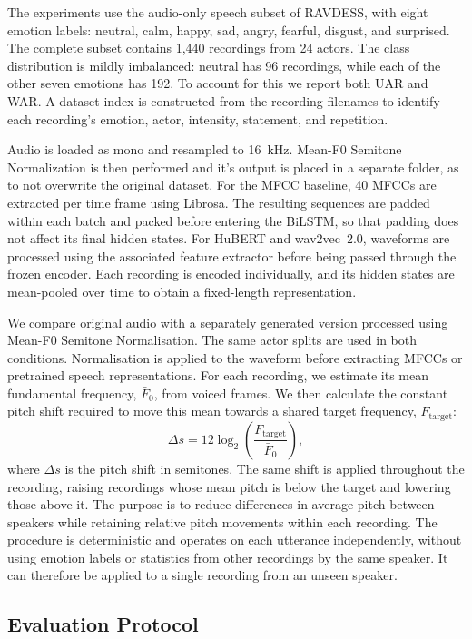 \documentclass[11pt, letterpaper]{article}
\begin{document}
The experiments use the audio-only speech subset of RAVDESS, with
eight emotion labels: neutral, calm, happy, sad, angry, fearful,
disgust, and surprised. The complete subset contains 1,440 recordings
from 24 actors. The class distribution is mildly imbalanced: neutral has 96 recordings, while each of the other seven emotions has 192. To account for this we report both UAR and WAR. A dataset index is constructed from the recording filenames to identify each recording's emotion, actor, intensity, statement, and repetition. 

Audio is loaded as mono and resampled to 16~kHz. Mean-F0 Semitone Normalization is then performed and it's output is placed in a separate folder, as to not overwrite the original dataset. For the MFCC baseline, 40 MFCCs are extracted per time frame using Librosa. The resulting sequences are padded within each batch and packed before entering the BiLSTM, so that padding does not affect its final hidden states. For HuBERT and wav2vec~2.0, waveforms are processed using the associated feature extractor before being passed through the frozen encoder. Each recording is encoded individually, and its hidden states are mean-pooled over time to obtain a fixed-length representation.

We compare original audio with a separately generated version processed using Mean-F0 Semitone Normalisation. The same actor splits are used in both conditions. Normalisation is applied to the waveform before extracting MFCCs or pretrained speech representations. For each recording, we estimate its mean fundamental frequency, $\bar{F}_0$, from voiced frames. We then calculate the constant pitch shift required to move this mean towards a shared target frequency, $F_{\mathrm{target}}$:
\[
    \Delta s
    =
    12\log_2\left(
        \frac{F_{\mathrm{target}}}{\bar{F}_0}
    \right),
\]
where $\Delta s$ is the pitch shift in semitones. The same shift is applied throughout the recording, raising recordings whose mean pitch is below the target and lowering those above it. The purpose is to reduce differences in average pitch between speakers while retaining relative pitch movements within each recording. The procedure is deterministic and operates on each utterance independently, without using emotion labels or statistics from other recordings by the same speaker. It can therefore be applied to a single recording from an unseen speaker.

\subsection{Evaluation Protocol}
\end{document}
